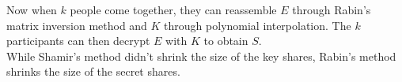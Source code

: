 \documentclass[12pt]{article}
\begin{document}
\noindent Now when $k$ people come together, they can reassemble $E$ through Rabin's matrix inversion method and $K$ through polynomial interpolation. The $k$ participants can then decrypt $E$ with $K$ to obtain $S$.\\

\noindent While Shamir's method didn't shrink the size of the key shares, Rabin's method shrinks the size of the secret shares.



\end{document}
